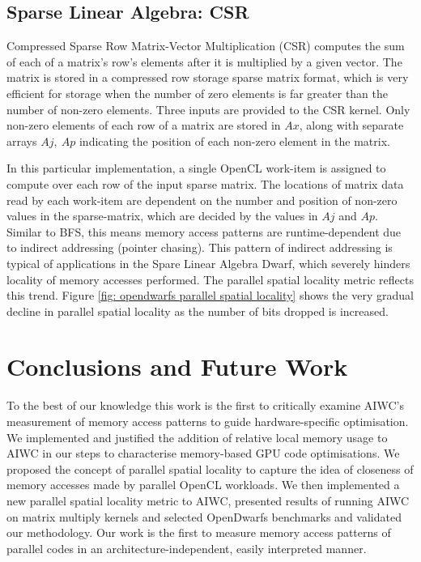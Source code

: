 \documentclass[review=false, sigchi]{acmart}
\begin{document}
	\subsection{Sparse Linear Algebra: CSR}
	
	Compressed Sparse Row Matrix-Vector Multiplication (CSR) computes the sum of each of a matrix's row's elements after it is multiplied by a given vector. The matrix is stored in a compressed row storage sparse matrix format, which is very efficient for storage when the number of zero elements is far greater than the number of non-zero elements. Three inputs are provided to the CSR kernel. Only non-zero elements of each row of a matrix are stored in $Ax$, along with separate arrays $Aj,\ Ap$ indicating the position of each non-zero element in the matrix.
	
	In this particular implementation, a single OpenCL work-item is assigned to compute over each row of the input sparse matrix. 
	The locations of matrix data read by each work-item are dependent on the number and position of non-zero values in the sparse-matrix, which are decided by the values in $Aj$ and $Ap$. 
	Similar to BFS, this means memory access patterns are runtime-dependent due to indirect addressing (pointer chasing).
	This pattern of indirect addressing is typical of applications in the Spare Linear Algebra Dwarf, which severely hinders locality of memory accesses performed. The parallel spatial locality metric reflects this trend. Figure \ref{fig: opendwarfs parallel spatial locality} shows the very gradual decline in parallel spatial locality as the number of bits dropped is increased.
	
	\section{Conclusions and Future Work} \label{future work}
	
	To the best of our knowledge this work is the first to critically examine AIWC's measurement of memory access patterns to guide hardware-specific optimisation. 
	We implemented and justified the addition of relative local memory usage to AIWC in our steps to characterise memory-based GPU code optimisations.
	We proposed the concept of parallel spatial locality to capture the idea of closeness of memory accesses made by parallel OpenCL workloads.
	We then implemented a new parallel spatial locality metric to AIWC, presented results of running AIWC on matrix multiply kernels and selected OpenDwarfs benchmarks and validated our methodology. 
	Our work is the first to measure memory access patterns of parallel codes in an architecture-independent, easily interpreted manner. %
	
\end{document}
